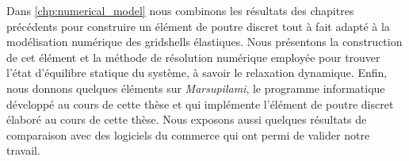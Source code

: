 Dans \cref{chp:numerical_model} nous combinons les résultats des chapitres précédents pour construire un élément de poutre discret tout à fait adapté à la modélisation numérique des gridshells élastiques. Nous présentons la construction de cet élément et la méthode de résolution numérique employée pour trouver l'état d'équilibre statique du système, à savoir le relaxation dynamique. Enfin, nous donnons quelques éléments sur \emph{Marsupilami}, le programme informatique développé au cours de cette thèse et qui implémente l'élément de poutre discret élaboré au cours de cette thèse. Nous exposons aussi quelques résultats de comparaison avec des logiciels du commerce qui ont permi de valider notre travail.

%
%
% 
%
%
%
%
%

%
%
%
%





%
%
%
%
%
%
%
%
%
%



